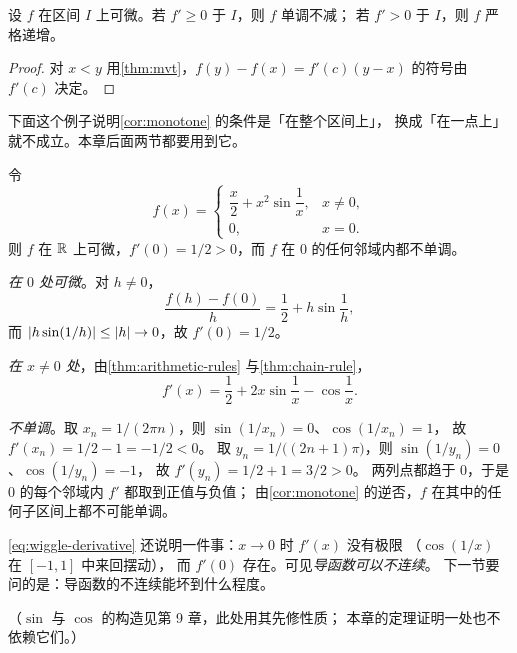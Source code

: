 \begin{corollary}[单调性判据]
  \label{cor:monotone}
  设 \(f\) 在区间 \(I\) 上可微。若 \(f' \ge 0\) 于 \(I\)，则 \(f\) 单调不减；
  若 \(f' > 0\) 于 \(I\)，则 \(f\) 严格递增。
\end{corollary}

\begin{proof}
  对 \(x<y\) 用\cref{thm:mvt}，\(f(y)-f(x)=f'(c)(y-x)\) 的符号由 \(f'(c)\) 决定。
\end{proof}

下面这个例子说明\cref{cor:monotone} 的条件是「在整个区间上」，
换成「在一点上」就不成立。本章后面两节都要用到它。

\begin{example}
  \label{ex:not-monotone-near-zero}
  令
  \begin{equation}
    \label{eq:wiggle}
    f(x) = \begin{cases}
      \dfrac{x}{2} + x^{2}\sin\dfrac{1}{x}, & x \neq 0, \\[2ex]
      0, & x = 0 .
    \end{cases}
  \end{equation}
  则 \(f\) 在 \(\mathbb{R}\) 上可微，\(f'(0)=1/2>0\)，而 \(f\) 在 \(0\) 的任何邻域内都不单调。
  \begin{worked}
    \emph{在 \(0\) 处可微}。对 \(h \neq 0\)，
    \[
      \frac{f(h)-f(0)}{h} = \frac{1}{2} + h\sin\frac{1}{h} ,
    \]
    而 \(\lvert h\sin(1/h)\rvert \le \lvert h\rvert \to 0\)，故 \(f'(0)=1/2\)。

    \emph{在 \(x \neq 0\) 处}，由\cref{thm:arithmetic-rules} 与\cref{thm:chain-rule}，
    \begin{equation}
      \label{eq:wiggle-derivative}
      f'(x) = \frac{1}{2} + 2x\sin\frac{1}{x} - \cos\frac{1}{x} .
    \end{equation}

    \emph{不单调}。取 \(x_{n} = 1/(2\pi n)\)，则 \(\sin(1/x_{n})=0\)、\(\cos(1/x_{n})=1\)，
    故 \(f'(x_{n}) = 1/2 - 1 = -1/2 < 0\)。
    取 \(y_{n} = 1/\bigl((2n+1)\pi\bigr)\)，则 \(\sin(1/y_{n})=0\)、\(\cos(1/y_{n})=-1\)，
    故 \(f'(y_{n}) = 1/2 + 1 = 3/2 > 0\)。
    两列点都趋于 \(0\)，于是 \(0\) 的每个邻域内 \(f'\) 都取到正值与负值；
    由\cref{cor:monotone} 的逆否，\(f\) 在其中的任何子区间上都不可能单调。
  \end{worked}
\end{example}

\begin{remark}
  \cref{eq:wiggle-derivative} 还说明一件事：\(x \to 0\) 时 \(f'(x)\) 没有极限
  （\(\cos(1/x)\) 在 \([-1,1]\) 中来回摆动），
  而 \(f'(0)\) 存在。可见\emph{导函数可以不连续}。
  下一节要问的是：导函数的不连续能坏到什么程度。

  （\(\sin\) 与 \(\cos\) 的构造见第 9 章，此处用其先修性质；
  本章的定理证明一处也不依赖它们。）
\end{remark}

